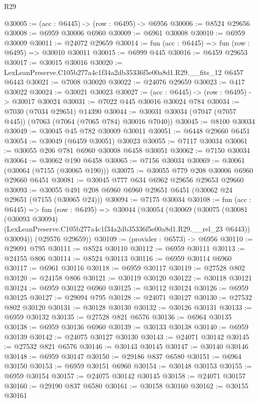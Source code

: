 \begin{lexlean}{R29}
\begin{coremodule}
@30005 := (acc : @6445) -> (row : @6495) -> @6956
@30006 := @8524 @29656
@30008 := @6959 @30006 @6960
@30009 := @6961 @30008
@30010 := @6959 @30009
@30011 := @24072 @29659
@30014 := fun (acc : @6445) => fun (row : @6495) => @30010 @30011
@30015 := @6999 @445
@30016 := @6459 @29653
@30017 := @30015 @30016
@30020 := LexLeanPreserve.C105b277a4c1f34a2db35336f5e00a8d1.R29.__fits_12 @6457 @6443
@30021 := @7008 @30020
@30022 := @24076 @29659
@30023 := @417 @30022
@30024 := @30021 @30023
@30027 := (acc : @6445) -> (row : @6495) -> @30017 @30024
@30031 := @7022 @445 @30016 @30024 @784
@30034 := @7030 (@7034 @29651) @14390
@30044 := @30031 @30034 (@7047 (@7057 @445)) (@7063 (@7064 (@7065 @784) @30016 @7040))
@30045 := @8100 @30034
@30049 := @30045 @45 @782 @30009 @30011
@30051 := @6448 @29660 @6451
@30054 := @30049 (@6459 @30051) @30023
@30055 := @7117 @30034
@30061 := @30055 @206 @781 @6960 @30008 @6458 @30051
@30062 := @7150 @30034
@30064 := @30062 @190 @6458
@30065 := @7156 @30034
@30069 := @30061 (@30064 (@7155 (@30065 @190)))
@30075 := @30055 @779 @208 @30006 @6960 @29660 @6451
@30081 := @30045 @777 @634 @6962 @29656 @29653 @29660
@30093 := @30055 @491 @208 @6960 @6960 @29651 @6451 (@30062 @24 @29651 (@7155 (@30065 @24)))
@30094 := @7175 @30034
@30108 := fun (acc : @6445) =>
  fun (row : @6495) =>
  @30044
    (@30054
      (@30069
        (@30075
          (@30081
            (@30093 @30094)
            (LexLeanPreserve.C105b277a4c1f34a2db35336f5e00a8d1.R29.__rel_23 @6443))
          @30094))
      (@29576 @29659))
@30109 := (provider : @6573) -> @6956
@30110 := @29091 @795
@30111 := @8524 @30110
@30112 := @6959 @30111
@30113 := @24155 @806
@30114 := @8524 @30113
@30116 := @6959 @30114 @6960
@30117 := @6961 @30116
@30118 := @6959 @30117
@30119 := @27528 @802
@30120 := @24158 @806
@30121 := @30119 @30120
@30122 := @30118 @30121
@30124 := @6959 @30122 @6960
@30125 := @30112 @30124
@30126 := @6959 @30125
@30127 := @29094 @795
@30128 := @24071 @30127
@30130 := @27532 @802 @30120
@30131 := @30128 @30130
@30132 := @30126 @30131
@30133 := @6959 @30132
@30135 := @27528 @821 @6576
@30136 := @6964 @30135
@30138 := @6959 @30136 @6960
@30139 := @30133 @30138
@30140 := @6959 @30139
@30142 := @24075 @30127 @30130
@30143 := @24071 @30142
@30145 := @27532 @821 @6576
@30146 := @30143 @30145
@30147 := @30140 @30146
@30148 := @6959 @30147
@30150 := @29186 @837 @6580
@30151 := @6964 @30150
@30153 := @6959 @30151 @6960
@30154 := @30148 @30153
@30155 := @6959 @30154
@30157 := @24075 @30142 @30145
@30158 := @24071 @30157
@30160 := @29190 @837 @6580
@30161 := @30158 @30160
@30162 := @30155 @30161

\end{coremodule}
\end{lexlean}
